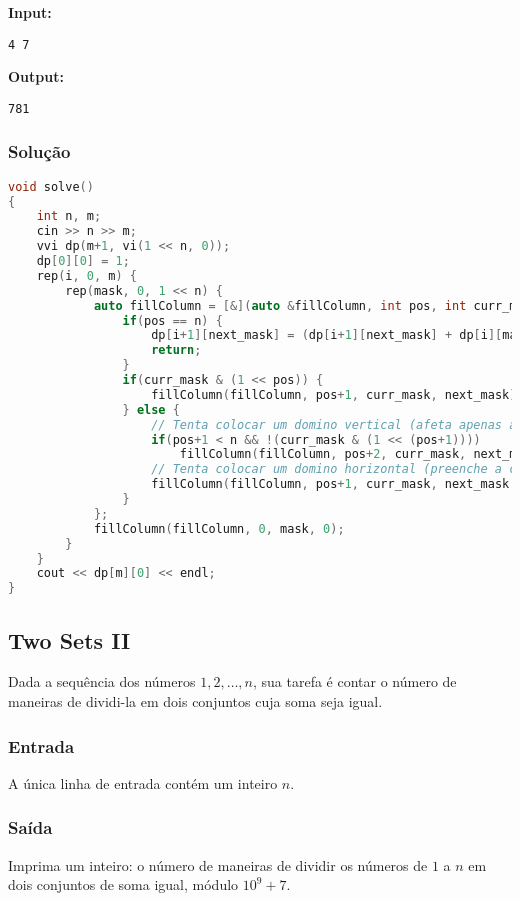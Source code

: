 \textbf{Input:}
\begin{verbatim}
4 7
\end{verbatim}

\textbf{Output:}
\begin{verbatim}
781
\end{verbatim}

\subsubsection*{Solução}
\begin{lstlisting}[language=C++]
void solve()
{
    int n, m;
    cin >> n >> m;
    vvi dp(m+1, vi(1 << n, 0));
    dp[0][0] = 1;
    rep(i, 0, m) {
        rep(mask, 0, 1 << n) {
            auto fillColumn = [&](auto &fillColumn, int pos, int curr_mask, int next_mask) -> void {
                if(pos == n) {
                    dp[i+1][next_mask] = (dp[i+1][next_mask] + dp[i][mask]) % mod;
                    return;
                }
                if(curr_mask & (1 << pos)) {
                    fillColumn(fillColumn, pos+1, curr_mask, next_mask);
                } else {
                    // Tenta colocar um domino vertical (afeta apenas a coluna atual)
                    if(pos+1 < n && !(curr_mask & (1 << (pos+1))))
                        fillColumn(fillColumn, pos+2, curr_mask, next_mask);
                    // Tenta colocar um domino horizontal (preenche a célula da próxima coluna)
                    fillColumn(fillColumn, pos+1, curr_mask, next_mask | (1 << pos));
                }
            };
            fillColumn(fillColumn, 0, mask, 0);
        }
    }
    cout << dp[m][0] << endl;
}
\end{lstlisting}

\subsection{Two Sets II}
Dada a sequência dos números \(1,2,\ldots,n\), sua tarefa é contar o número de maneiras de dividi-la em dois conjuntos cuja soma seja igual.

\subsubsection*{Entrada}
A única linha de entrada contém um inteiro \(n\).

\subsubsection*{Saída}
Imprima um inteiro: o número de maneiras de dividir os números de \(1\) a \(n\) em dois conjuntos de soma igual, módulo \(10^9+7\).

